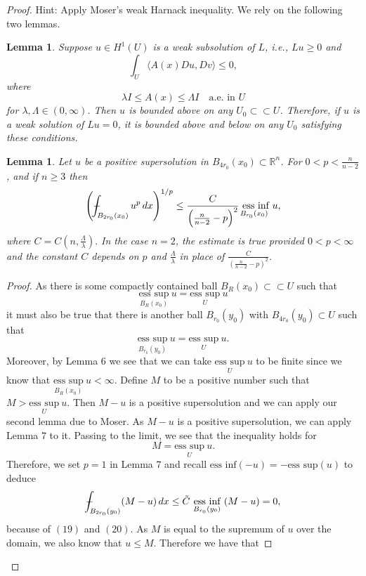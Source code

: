 \documentclass{article}
\newtheorem{lemma}[theorem]{Lemma}
\def\Xint#1{\mathchoice
{\XXint\displaystyle\textstyle{#1}}%
{\XXint\textstyle\scriptstyle{#1}}%
{\XXint\scriptstyle\scriptscriptstyle{#1}}%
{\XXint\scriptscriptstyle\scriptscriptstyle{#1}}%
\!\int}
\def\XXint#1#2#3{{\setbox0=\hbox{$#1{#2#3}{\int}$ }
\vcenter{\hbox{$#2#3$ }}\kern-.6\wd0}}
\def\dashint{\Xint-}
\begin{document}
\begin{flushleft}
\begin{proof}
Hint: Apply Moser’s weak Harnack inequality. We rely on the following two lemmas.
\begin{lemma}
Suppose $u\in H^1(U)$ is a weak subsolution of $L$, i.e., $Lu \ge 0$ and
$$\int_U \langle A(x)Du,Dv\rangle \le 0,$$
where
$$\lambda I \le A(x) \le \Lambda I \quad \text{a.e. in $U$}$$
for $\lambda,\Lambda \in(0,\infty)$. Then $u$ is bounded above on any $U_0 \subset \subset U$. Therefore, if $u$ is a weak solution of $Lu=0$, it is bounded above and below on any $U_0$ satisfying these conditions.
\end{lemma}
\begin{lemma}
Let $u$ be a positive supersolution in $B_{4{r_0}}(x_0)\subset \mathbb R^n$. For $0 < p < \frac{n}{n-2}$, and if $n\ge 3$ then 
$$\left(\dashint_{B_{2{r_0}}(x_0)} u^p\,dx\right)^{1/p} \le \frac{C}{\left(\frac{n}{n-2}-p\right)^2} \underset{B_{r_0}(x_0)}{~\text{ess inf}}~u,$$
where $C = C(n,\frac{\Lambda}{\lambda}).$ In the case $n=2$, the estimate is true provided $0<p<\infty$ and the constant $C$ depends on $p$ and $\frac{\Lambda}{\lambda}$ in place of $\frac{C}{\left(\frac{n}{n-2}-p\right)^2}$.
\end{lemma}
\begin{proof}
As there is some compactly contained ball $B_R(x_0)\subset \subset U$ such that
$$\underset{B_R(x_0)}{\text{ess sup}}~ u = \underset{U}{\text{ess sup}}~ u$$
it must also be true that there is another ball $B_{r_0}(y_0)$ with $B_{4{r_0}}(y_0) \subset U$ such that
\begin{equation}
\underset{B_{r_0}(y_0)}{\text{ess sup}}~ u = \underset{U}{\text{ess sup}}~ u.    
\end{equation}
Moreover, by Lemma $6$ we see that we can take $\underset{U}{\text{ess sup}}~ u$ to be finite since we know that $\underset{B_R(x_0)}{\text{ess sup}}~ u < \infty$. Define $M$ to be a positive number such that $M > \underset{U}{\text{ess sup}}~ u$. Then $M-u$ is a positive supersolution and we can apply our second lemma due to Moser. As $M-u$ is a positive supersolution, we can apply Lemma $7$ to it. Passing to the limit, we see that the inequality holds for
\begin{equation}M = \underset{U}{\text{ess sup}}~ u.\end{equation}
Therefore, we set $p=1$ in Lemma $7$ and recall $\text{ess inf}(-u)= -\text{ess sup}(u)$ to deduce
$$\dashint_{B_{2{r_0}}(y_0)} (M-u)\,dx \le \tilde{C} ~\underset{{B_{r_0}(y_0)}}{\text{ess inf}}~(M-u)=0,$$
because of $(19)$ and $(20)$. As $M$ is equal to the supremum of $u$ over the domain, we also know that $u\le M$. Therefore we have that

\end{proof}
\end{proof}
\end{flushleft}
\end{document}
